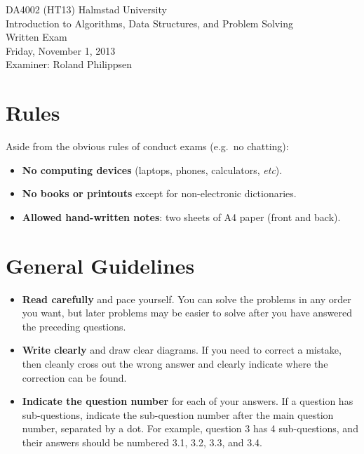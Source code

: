 \documentclass[a4paper]{article}
\newcounter{question}
\begin{document}
\pagestyle{empty}
\thispagestyle{empty}



\noindent
\begin{minipage}{\columnwidth}
  \centering
  \Large
  DA4002 (HT13) Halmstad University\\
  Introduction to Algorithms, Data Structures, and Problem Solving\\[3\baselineskip]
  \Huge
  Written Exam\\
  \Large
  Friday, November 1, 2013\\[2\baselineskip]
  Examiner: Roland Philippsen
\end{minipage}

\vfill

\noindent
\begin{center}
\end{center}

\vfill



\section*{Rules}

Aside from the obvious rules of conduct exams (e.g.\ no chatting):

\begin{itemize}
\item
  \textbf{No computing devices} (laptops, phones, calculators, \emph{etc}).
\item
  \textbf{No books or printouts} except for non-electronic dictionaries.
\item
  \textbf{Allowed hand-written notes}: two sheets of A4 paper (front and back).
\end{itemize}



\section*{General Guidelines}

\begin{itemize}
\item
  \textbf{Read carefully} and pace yourself.
  You can solve the problems in any order you want, but later problems may be easier to solve after you have answered the preceding questions.
\item
  \textbf{Write clearly} and draw clear diagrams.
  If you need to correct a mistake, then cleanly cross out the wrong answer and clearly indicate where the correction can be found.
\item
  \textbf{Indicate the question number} for each of your answers.
  If a question has sub-questions, indicate the sub-question number after the main question number, separated by a dot.
  For example, question 3 has 4 sub-questions, and their answers should be numbered 3.1, 3.2, 3.3, and 3.4.
\end{itemize}
\end{document}
